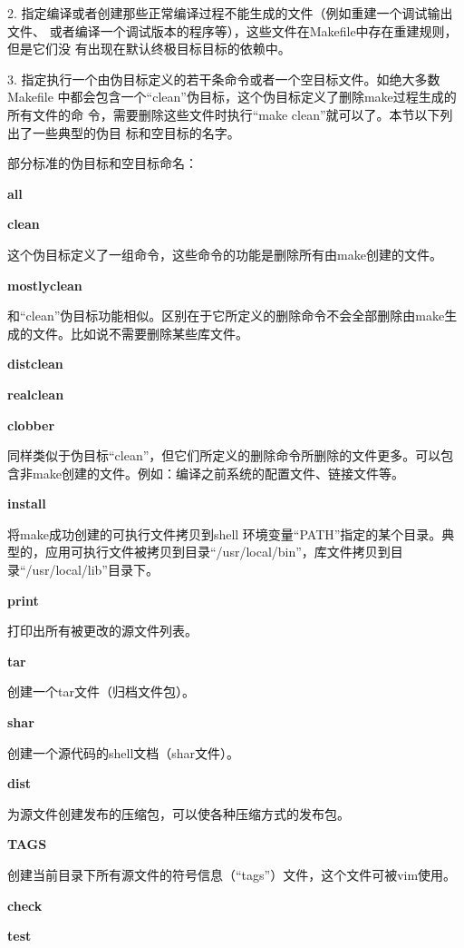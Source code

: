 2. 指定编译或者创建那些正常编译过程不能生成的文件（例如重建一个调试输出文件、
或者编译一个调试版本的程序等），这些文件在Makefile中存在重建规则，但是它们没
有出现在默认终极目标目标的依赖中。

3. 指定执行一个由伪目标定义的若干条命令或者一个空目标文件。如绝大多数Makefile
中都会包含一个“clean”伪目标，这个伪目标定义了删除make过程生成的所有文件的命
令，需要删除这些文件时执行“make clean”就可以了。本节以下列出了一些典型的伪目
标和空目标的名字。

部分标准的伪目标和空目标命名：
\begin{dinglist}{71}
\itemsep=4pt \parskip=0pt
\item \textbf{all}

\item \textbf{clean}

这个伪目标定义了一组命令，这些命令的功能是删除所有由make创建的文件。
\item \textbf{mostlyclean}

和“clean”伪目标功能相似。区别在于它所定义的删除命令不会全部删除由make生成的文件。比如说不需要删除某些库文件。
\item \textbf{distclean}

\item \textbf{realclean}

\item \textbf{clobber}

同样类似于伪目标“clean”，但它们所定义的删除命令所删除的文件更多。可以包含非make创建的文件。例如：编译之前系统的配置文件、链接文件等。
\item \textbf{install}

将make成功创建的可执行文件拷贝到shell 环境变量“PATH”指定的某个目录。典型的，应用可执行文件被拷贝到目录“/usr/local/bin”，库文件拷贝到目录“/usr/local/lib”目录下。
\item \textbf{print}

打印出所有被更改的源文件列表。
\item \textbf{tar}

创建一个tar文件（归档文件包）。
\item \textbf{shar}

创建一个源代码的shell文档（shar文件）。
\item \textbf{dist}

为源文件创建发布的压缩包，可以使各种压缩方式的发布包。
\item \textbf{TAGS}

创建当前目录下所有源文件的符号信息（“tags”）文件，这个文件可被vim使用。
\item \textbf{check}
\item \textbf{test}

\end{dinglist}

